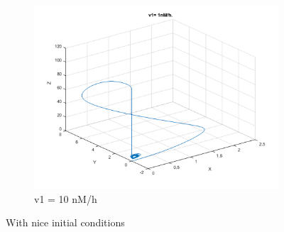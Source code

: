 \documentclass[10pt,a4paper,oneside,twocolumn]{article}
\numberwithin{equation}{section} %
\begin{document}
\begin{figure}
\begin{subfigure}[b]{0.32\textwidth}
	    \includegraphics[width=\textwidth]{LotsofthesameA/A-AA10.png}
	    \caption{v1 = 10 nM/h}
	\end{subfigure}
	
	\caption{With nice initial conditions}
    \end{figure}
\end{document}
